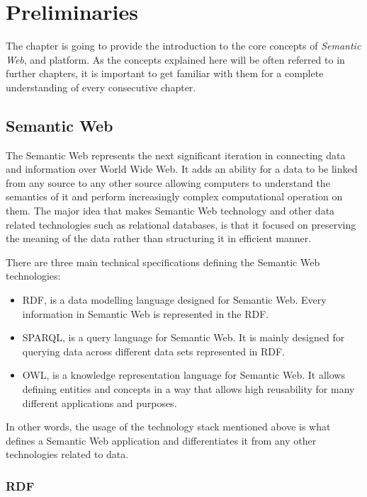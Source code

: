 \chapter{Preliminaries}
\label{chap:num_1}

The chapter is going to provide the introduction to the core concepts of \textit{Semantic Web}, \solid{} and \lpa{} platform. As the concepts explained here will be often referred to in further chapters, it is important to get familiar with them for a complete understanding of every consecutive chapter. 

\section{Semantic Web}
\label{sssec:semantic_web_intro}

The Semantic Web represents the next significant iteration in connecting data and information over World Wide Web. It adds an ability for a data to be linked from any source to any other source allowing computers to understand the semantics of it and perform increasingly complex computational operation on them. The major idea that makes Semantic Web technology and other data related technologies such as relational databases, is that it focused on preserving the meaning of the data rather than structuring it in efficient manner. 

There are three main technical specifications defining the Semantic Web technologies:
\begin{itemize}
	\item \gls{RDF}, is a data modelling language designed for Semantic Web. Every information in Semantic Web is represented in the RDF.
	\item \gls{SPARQL}, is a query language for Semantic Web. It is mainly designed for querying data across different data sets represented in RDF.
	\item \gls{OWL}, is a knowledge representation language for Semantic Web. It allows defining entities and concepts in a way that allows high reusability for many different applications and purposes.
\end{itemize}  

In other words, the usage of the technology stack mentioned above is what defines a Semantic Web application and differentiates it from any other technologies related to data.

\subsection{RDF}


